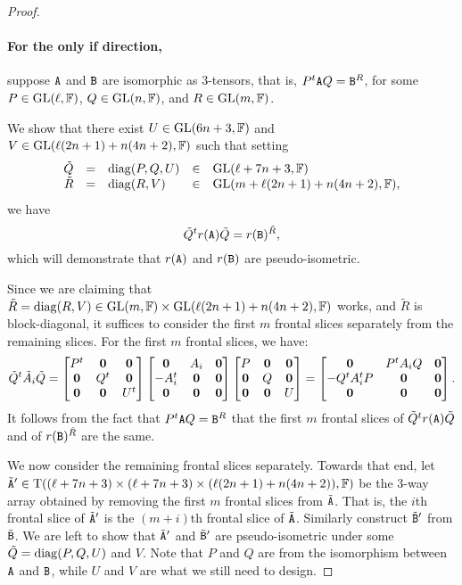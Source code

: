 \documentclass[11pt]{article}
\begin{document}
\begin{proof}
\paragraph{For the only if direction,} suppose $\mathtt{A}$ and $\mathtt{B}$ are isomorphic as 3-tensors, 
that is, $P^t\mathtt{A} 
Q=\mathtt{B}^R$, for some $P\in\mathrm{GL}(\ell, \mathbb{F})$, $Q\in \mathrm{GL}(n, \mathbb{F})$, and $R\in \mathrm{GL}(m, \mathbb{F})$. 

We show that there exist $U \in \mathrm{GL}(6n+3, \mathbb{F})$ and 
$V \in \mathrm{GL}(\ell(2n+1) + n(4n+2), \mathbb{F})$ 
such that setting 
\[
\begin{array}{rclcl}
\tilde Q & =& \operatorname{diag}(P, Q, U) & \in & \mathrm{GL}(\ell+7n+3, \mathbb{F}) \\
\tilde R & = & \operatorname{diag}(R, V) & \in & \mathrm{GL}(m+\ell(2n+1)+n(4n+2),\mathbb{F}),
\end{array}
\]
 we have 
\[
\tilde Q^t r(\mathtt{A}) \tilde Q=r(\mathtt{B})^{\tilde R},
\]
which will demonstrate that $r(\mathtt{A})$ and $r(\mathtt{B})$ are pseudo-isometric. 

Since we are claiming that $\tilde R = \operatorname{diag}(R,V) \in \mathrm{GL}(m,\mathbb{F}) \times 
\mathrm{GL}(\ell(2n+1) + n(4n+2), \mathbb{F})$ works, and $\tilde R$ is block-diagonal, it 
suffices to consider the first $m$ frontal slices separately from the remaining 
slices. For the first $m$ frontal slices, we have:
\[
\tilde Q^t \tilde A_i \tilde Q
=
\begin{bmatrix}
P^t & \mathbf{0} & \mathbf{0} \\
\mathbf{0} & Q^t & \mathbf{0} \\
\mathbf{0} & \mathbf{0} & U^t 
\end{bmatrix}
\begin{bmatrix}
\mathbf{0} & A_i & \mathbf{0} \\
-A_i^t & \mathbf{0} & \mathbf{0} \\
\mathbf{0} & \mathbf{0} & \mathbf{0} 
\end{bmatrix}
\begin{bmatrix}
P & \mathbf{0} & \mathbf{0} \\
\mathbf{0} & Q & \mathbf{0} \\
\mathbf{0} & \mathbf{0} & U
\end{bmatrix}
=
\begin{bmatrix}
\mathbf{0} & P^t A_i Q & \mathbf{0} \\
-Q^t A_i^t P&\mathbf{0} & \mathbf{0} \\
\mathbf{0} & \mathbf{0} & \mathbf{0} 
\end{bmatrix}.
\]
It follows from the fact that $P^t \mathtt{A} Q = \mathtt{B}^R$ that the first $m$ frontal slices of $\tilde 
Q^t r(\mathtt{A}) \tilde Q$ and of $r(\mathtt{B})^{\tilde R}$ are 
the same.

We now consider the remaining frontal slices separately. Towards that end, 
let $\tilde {\mathtt{A}}'\in\mathrm{T}((\ell+7n+3)\times(\ell+7n+3)\times (\ell(2n+1)+n(4n+2)), 
\mathbb{F})$ be the 3-way array obtained by removing the first $m$ frontal slices from 
$\tilde {\mathtt{A}}$. That is, the $i$th frontal slice of $\tilde {\mathtt{A}}'$ is the $(m+i)$th 
frontal slice of $\tilde {\mathtt{A}}$. Similarly construct $\tilde{\mathtt{B}}'$ from $\tilde{\mathtt{B}}$. 
We are left to show that $\tilde{\mathtt{A}}'$ and $\tilde{\mathtt{B}}'$ are pseudo-isometric under 
some $\tilde Q=\operatorname{diag}(P, Q, U)$ and $V$. Note that $P$ and 
$Q$ are from the isomorphism between $\mathtt{A}$ and $\mathtt{B}$, while $U$ and $V$ are what we still need to design.


\end{proof}
\end{document}

